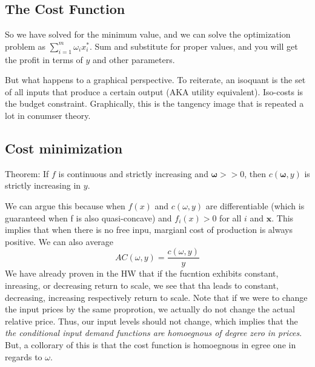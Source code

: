 \documentclass[12pt]{article}
\begin{document}
\subsection{The Cost Function}
So we have solved for the minimum value, and we can solve the optimization problem as $\sum_{i =1 }^m \omega_i x_i^*$. Sum and substitute for proper values, and you will get the profit in terms of $y$ and other parameters.


But what happens to a graphical perspective. To reiterate, an isoquant is the set of all inputs that produce a certain output (AKA utility equivalent). Iso-costs is the budget constraint. Graphically, this is the tangency image that is repeated a lot in conumser theory. 
\subsection{Cost minimization}
Theorem: If $f$ is continuous and strictly increasing and $\mathbf{\omega} >> 0$, then $c(\mathbf{\omega}, y)$ is strictly increasing in $y$. 

We can argue this because when $f(x)$ and $c(\omega, y)$ are differentiable (which is guaranteed when f is also quasi-concave) and $f_i(x) > 0$ for all $i$ and $\mathbf{x}$. This implies that when there is no free inpu, margianl cost of production is always positive. We can also average 
\[
AC(\omega, y) = \frac{c(\omega, y)}{y}
\]
We have already proven in the HW that if the fucntion exhibits constant, inreasing, or decreasing return to scale, we see that tha leads to constant, decreasing, increasing respectively return to scale. Note that if we were to change the input prices by the same proprotion, we actually do not change the actual relative price. Thus, our input levels should not change, which implies that the \emph{the conditional input demand functions are homoegnous of degree zero in prices}. But, a collorary of this is that the cost function is homoegnous in egree one in regards to $\omega$. 
\end{document}
